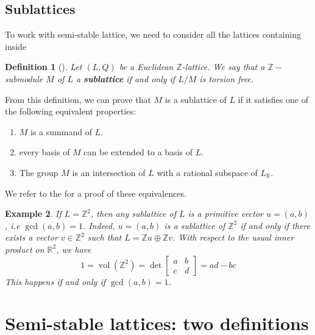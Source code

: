\documentclass[12pt]{article} %
\newtheorem{definition}{Definition}[section]
\newtheorem{example}[definition]{Example}
\DeclareMathOperator{\vol}{vol}
\newcommand{\tpoint}[1]{\subsection{#1}}
\begin{document}
\tpoint{Sublattices}
To work with semi-stable lattice, we need to consider all the lattices containing inside
\begin{definition}[\label=sublattice]
    Let $(L,Q)$ be a Euclidean $\mathbb{Z}$-lattice. We say that a $\mathbb{Z}-$submodule $M$ of
    $L$ a \textbf{sublattice} if and only if $L/M$ is torsion free.
\end{definition}
From this definition, we can prove that $M$ is a sublattice of $L$ if it satisfies one of the
following equivalent properties:
\begin{enumerate}
    \item $M$ is a summand of $L$.
    \item every basis of $M$ can be extended to a basis of $L$.
    \item The group $M$ is an intersection of $L$ with a rational subspace of $L_\mathbb{R}$.
\end{enumerate}
We refer to the \cite{} for a proof of these equivalences.
\begin{example}
    If $L = \mathbb{Z}^2$, then any sublattice of $L$ is a primitive vector $u = (a,b)$, i.e
    $\gcd(a,b)=1$. Indeed, $u=(a,b)$ is a sublattice of $\mathbb{Z}^2$ if and only if there exists a vector $v \in \mathbb{Z}^2$
    such that $L = \mathbb{Z}u \oplus \mathbb{Z}v$. With respect to the usual inner product on $\mathbb{R}^2$,
    we have
    \[1 = \vol(\mathbb{Z}^2) = \det \begin{bmatrix}
            a & b \\
            c & d
        \end{bmatrix} = ad-bc\]
    This happens if and only if $\gcd(a,b)=1$.
\end{example}
\section{Semi-stable lattices: two definitions}
\end{document}

